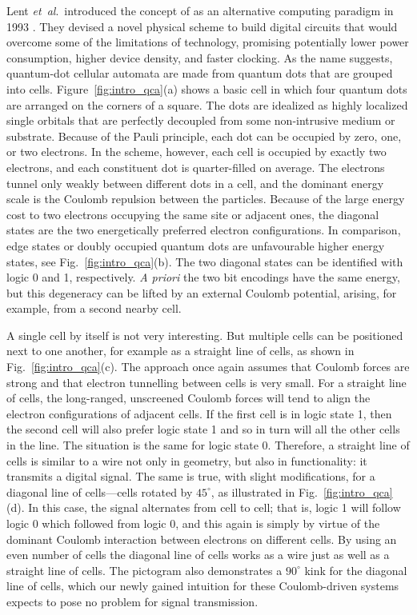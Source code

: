 Lent \emph{et~al}.\ introduced the concept of  as an alternative
computing paradigm in 1993 \cite{lent1993quantum}. They devised a novel physical
scheme to build digital circuits that would overcome some of the limitations of
 technology, promising potentially lower power consumption, higher
device density, and faster clocking. As the name suggests, quantum-dot cellular
automata are made from quantum dots that are grouped into cells.
Figure~\ref{fig:intro_qca}(a) shows a basic  cell in which four
quantum dots are arranged on the corners of a square. The dots are idealized as
highly localized single orbitals that are perfectly decoupled from some
non-intrusive medium or substrate. Because of the Pauli principle, each dot can
be occupied by zero, one, or two electrons. In the  scheme, however,
each cell is occupied by exactly two electrons, and each constituent dot is
quarter-filled on average. The electrons tunnel only weakly between different
dots in a cell, and the dominant energy scale is the Coulomb repulsion between
the particles. Because of the large energy cost to two electrons occupying the
same site or adjacent ones, the diagonal states are the two energetically
preferred electron configurations. In comparison, edge states or doubly occupied
quantum dots are unfavourable higher energy states, see
Fig.~\ref{fig:intro_qca}(b). The two diagonal states can be identified with
logic 0 and 1, respectively. \emph{A priori} the two bit encodings have the same
energy, but this degeneracy can be lifted by an external Coulomb potential,
arising, for example, from a second nearby  cell.

A single cell by itself is not very interesting. But multiple cells can be
positioned next to one another, for example as a straight line of cells, as
shown in Fig.~\ref{fig:intro_qca}(c). The approach once again assumes that
Coulomb forces are strong and that electron tunnelling between cells is very
small. For a straight line of cells, the long-ranged, unscreened Coulomb forces
will tend to align the electron configurations of adjacent cells. If the first
cell is in logic state 1, then the second cell will also prefer logic state 1
and so in turn will all the other cells in the line. The situation is the same
for logic state 0. Therefore, a straight line of cells is similar to a wire not
only in geometry, but also in functionality: it transmits a digital signal. The
same is true, with slight modifications, for a diagonal line of cells---cells
rotated by $45^{\circ}$, as illustrated in Fig.~\ref{fig:intro_qca}(d). In this
case, the signal alternates from cell to cell; that is, logic 1 will follow
logic 0 which followed from logic 0, and this again is simply by virtue of the
dominant Coulomb interaction between electrons on different cells. By using an
even number of cells the diagonal line of cells works as a wire just as well as
a straight line of cells. The pictogram also demonstrates a $90^{\circ}$ kink
for the diagonal line of cells, which our newly gained intuition for these
Coulomb-driven systems expects to pose no problem for signal transmission.

